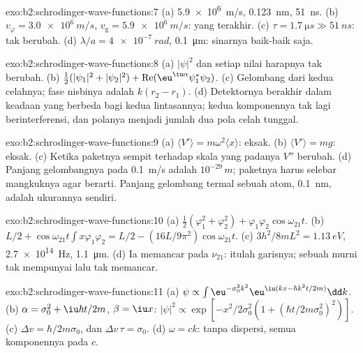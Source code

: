\begin{solution}{exo:b2:schrodinger-wave-functions:7}
(a) \qty{5.9e6}{m/s}, \qty{0.123}{nm}, \qty{51}{ns}. (b) $v_\varphi = \qty{3.0e6}{m/s}$,
$v_{\text{g}} = \qty{5.9e6}{m/s}$: yang terakhir. (c) $\tau = \qty{1.7}{\micro s} \gg
\qty{51}{ns}$: tak berubah. (d) $\lambda/a = \qty{4e-7}{rad}$, \qty{0.1}{\micro m}:
sinarnya baik-baik saja.
\end{solution}

\begin{solution}{exo:b2:schrodinger-wave-functions:8}
(a) $|\psi|^2$ dan setiap nilai harapnya tak berubah. (b) $\tfrac12(|\psi_1|^2
+ |\psi_2|^2) + \operatorname{Re}(\eu^{\iu\alpha}\psi_1^*\psi_2)$. (c) Gelombang dari
kedua celahnya; fase nisbinya adalah $k(r_2 - r_1)$. (d) Detektornya
berakhir dalam keadaan yang berbeda bagi kedua lintasannya; kedua komponennya tak
lagi berinterferensi, dan polanya menjadi jumlah dua pola celah
tunggal.
\end{solution}

\begin{solution}{exo:b2:schrodinger-wave-functions:9}
(a) $\langle V'\rangle = m\omega^2\langle x\rangle$: eksak. (b) $\langle V'\rangle
= mg$: eksak. (c) Ketika paketnya sempit terhadap skala yang padanya
$V''$ berubah. (d) Panjang gelombangnya pada \qty{0.1}{m/s} adalah $10^{-29}\,\unit{m}$;
paketnya harus selebar mangkuknya agar berarti. Panjang gelombang termal
sebuah atom, \qty{0.1}{nm}, adalah ukurannya sendiri.
\end{solution}

\begin{solution}{exo:b2:schrodinger-wave-functions:10}
(a) $\tfrac12(\varphi_1^2 + \varphi_2^2) + \varphi_1\varphi_2\cos\omega_{21}t$. (b) $L/2 +
\cos\omega_{21}t\int x\varphi_1\varphi_2 = L/2 - (16L/9\pi^2)\cos\omega_{21}t$. (c)
$3h^2/8mL^2 = \qty{1.13}{eV}$, \qty{2.7e14}{Hz}, \qty{1.1}{\micro m}. (d) Ia memancar
pada $\nu_{21}$: itulah garisnya; sebuah  murni tak mempunyai  lalu tak memancar.
\end{solution}

\begin{solution}{exo:b2:schrodinger-wave-functions:11}
(a) $\psi \propto \int\eu^{-\sigma_0^2k^2}\eu^{\iu(kx - \hbar k^2t/2m)}\dd k$. (b) $\alpha =
\sigma_0^2 + \iu\hbar t/2m$, $\beta = \iu x$: $|\psi|^2 \propto \exp[-x^2/2\sigma_0^2(1 +
(\hbar t/2m\sigma_0^2)^2)]$. (c) $\Delta v = \hbar/2m\sigma_0$, dan $\Delta v\,\tau =
\sigma_0$. (d) $\omega = ck$: tanpa dispersi, semua komponennya pada $c$.
\end{solution}

